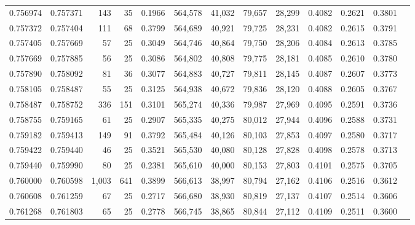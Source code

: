 \begin{tabular}{rrrrrrrrrrrrr}
0.756974 & 0.757371 &   143 &  35 &                                     0.1966 & 564,578 &  41,032 &  79,657 &  28,299 & 0.4082 & 0.2621 & 0.3801 \\
0.757372 & 0.757404 &   111 &  68 &                                     0.3799 & 564,689 &  40,921 &  79,725 &  28,231 & 0.4082 & 0.2615 & 0.3791 \\
0.757405 & 0.757669 &    57 &  25 &                                     0.3049 & 564,746 &  40,864 &  79,750 &  28,206 & 0.4084 & 0.2613 & 0.3785 \\
0.757669 & 0.757885 &    56 &  25 &                                     0.3086 & 564,802 &  40,808 &  79,775 &  28,181 & 0.4085 & 0.2610 & 0.3780 \\
0.757890 & 0.758092 &    81 &  36 &                                     0.3077 & 564,883 &  40,727 &  79,811 &  28,145 & 0.4087 & 0.2607 & 0.3773 \\
0.758105 & 0.758487 &    55 &  25 &                                     0.3125 & 564,938 &  40,672 &  79,836 &  28,120 & 0.4088 & 0.2605 & 0.3767 \\
0.758487 & 0.758752 &   336 & 151 &                                     0.3101 & 565,274 &  40,336 &  79,987 &  27,969 & 0.4095 & 0.2591 & 0.3736 \\
0.758755 & 0.759165 &    61 &  25 &                                     0.2907 & 565,335 &  40,275 &  80,012 &  27,944 & 0.4096 & 0.2588 & 0.3731 \\
0.759182 & 0.759413 &   149 &  91 &                                     0.3792 & 565,484 &  40,126 &  80,103 &  27,853 & 0.4097 & 0.2580 & 0.3717 \\
0.759422 & 0.759440 &    46 &  25 &                                     0.3521 & 565,530 &  40,080 &  80,128 &  27,828 & 0.4098 & 0.2578 & 0.3713 \\
0.759440 & 0.759990 &    80 &  25 &                                     0.2381 & 565,610 &  40,000 &  80,153 &  27,803 & 0.4101 & 0.2575 & 0.3705 \\
0.760000 & 0.760598 & 1,003 & 641 &                                     0.3899 & 566,613 &  38,997 &  80,794 &  27,162 & 0.4106 & 0.2516 & 0.3612 \\
0.760608 & 0.761259 &    67 &  25 &                                     0.2717 & 566,680 &  38,930 &  80,819 &  27,137 & 0.4107 & 0.2514 & 0.3606 \\
0.761268 & 0.761803 &    65 &  25 &                                     0.2778 & 566,745 &  38,865 &  80,844 &  27,112 & 0.4109 & 0.2511 & 0.3600 \\

\end{tabular}
